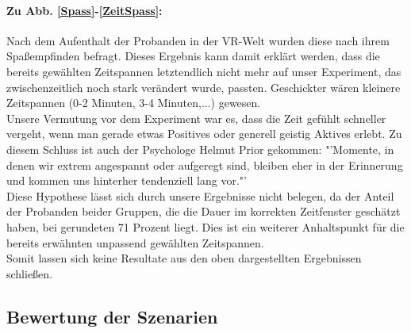 \documentclass{Paper}
\begin{document}
\paragraph{Zu Abb. \ref{Spass}-\ref{ZeitSpass}:} Nach dem Aufenthalt der Probanden in der VR-Welt wurden diese nach ihrem Spaßempfinden befragt. Dieses Ergebnis kann damit erklärt werden, dass die bereits gewählten Zeitspannen letztendlich nicht mehr auf unser Experiment, das zwischenzeitlich noch stark verändert wurde, passten. Geschickter wären kleinere Zeitspannen (0-2 Minuten, 3-4 Minuten,...) gewesen.\\
Unsere Vermutung vor dem Experiment war es, dass die Zeit gefühlt schneller vergeht, wenn man gerade etwas Positives oder generell geistig Aktives erlebt. Zu diesem Schluss ist auch der Psychologe Helmut Prior gekommen: "'Momente, in denen wir extrem angespannt oder aufgeregt sind, bleiben eher in der Erinnerung und kommen uns hinterher tendenziell lang vor."' \cite{Irle2017} \\
Diese Hypothese lässt sich durch unsere Ergebnisse nicht belegen, da der Anteil der Probanden beider Gruppen, die die Dauer im korrekten Zeitfenster geschätzt haben, bei gerundeten 71 Prozent liegt. Dies ist ein weiterer Anhaltspunkt für die bereits erwähnten unpassend gewählten Zeitspannen.\\
Somit lassen sich keine Resultate aus den oben dargestellten Ergebnissen schließen.

\subsection{Bewertung der Szenarien}
\end{document}
